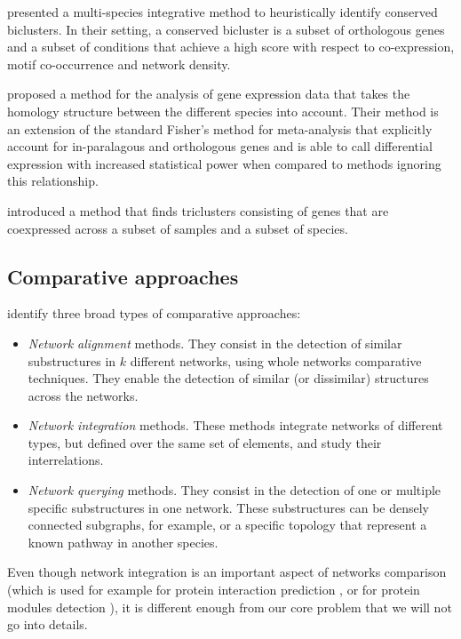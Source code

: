 		\Textcite{waltman2010multi} presented a multi-species integrative method to heuristically identify conserved biclusters.
		In their setting, a conserved bicluster is a subset of orthologous genes and a subset of conditions that achieve a high score with respect to co-expression, motif co-occurrence and network density.

		\Textcite{kristiansson2013novel} proposed a method for the analysis of gene expression data that takes the homology structure between the different species into account.
		Their method is an extension of the standard Fisher's method for meta-analysis \parencites{hu2006statistical}{campain2010comparison}{tseng2012comprehensive} that explicitly account for in-paralagous and orthologous genes and is able to call differential expression with increased statistical power when compared to methods ignoring this relationship.

		\Textcite{dede2014triclust} introduced a method that finds triclusters consisting of genes that are coexpressed across a subset of samples and a subset of species.

	\subsection{Comparative approaches}
	\label{subsec:compapproches}

	\Textcite{sharan2006modeling} identify three broad types of comparative approaches:
	\begin{itemize}
	\item \emph{Network alignment} methods.
		They consist in the detection of similar substructures in $k$ different networks, using whole networks comparative techniques.
		They enable the detection of similar (or dissimilar) structures across the networks.

	\item \emph{Network integration} methods.
		These methods integrate networks of different types, but defined over the same set of elements, and study their interrelations.

	\item \emph{Network querying} methods.
		They consist in the detection of one or multiple specific substructures in one network.
		These substructures can be densely connected subgraphs, for example, or a specific topology that represent a known pathway in another species.
	\end{itemize}

	Even though network integration is an important aspect of networks comparison (which is used for example for protein interaction prediction \parencite{rhodes2005probabilistic}, or for protein modules detection \parencites{kelley2005systematic}{zhang2005biology}), it is different enough from our core problem that we will not go into details.

